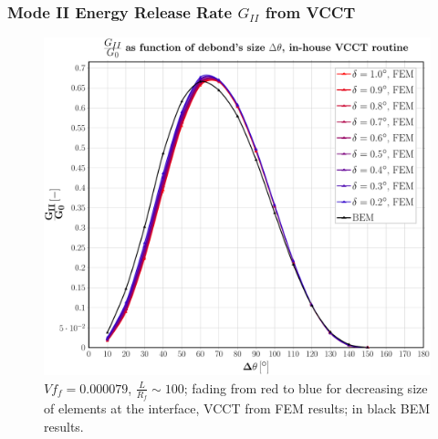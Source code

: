 \documentclass[first,firstsupp,lastsupp,last,hyperref,table]{ETHclass}
\begin{document}
\begin{frame}
\frametitle{\small Mode II Energy Release Rate $G_{II}$ from VCCT}
\vspace{-0.5cm}
\centering
\captionsetup[figure]{font=scriptsize,labelfont=scriptsize}
\begin{figure}[!h]
\centering
\includegraphics[height=0.7\textheight]{2017-07-10_AbqRunSummary_SmallStrain_M-F-VCCT_GII.pdf}
  \caption{\scriptsize $Vf_{f}=0.000079$, $\frac{L}{R_{f}}\sim 100$; fading from red to blue for decreasing size of elements at the interface, VCCT from FEM results; in black BEM results.}
  \label{fig:res1}
\end{figure}
\end{frame}
\end{document}
